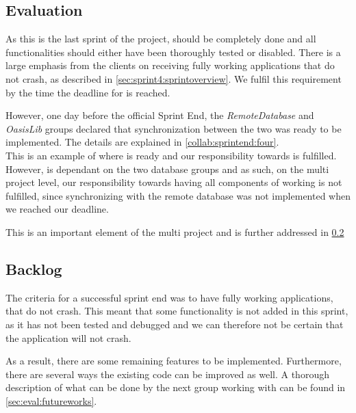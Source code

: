 \subsection{Evaluation}

As this is the last sprint of the project, \launcher should be completely done and all functionalities should either have been thoroughly tested or disabled.
There is a large emphasis from the clients on receiving  fully working applications that do not crash, as described in \cref{sec:sprint4:sprintoverview}.
We fulfil this requirement by the time the deadline for \launcher is reached.

However, one day before the official Sprint End, the \textit{RemoteDatabase} and \textit{OasisLib} groups declared that synchronization between the two was ready to be implemented.
The details are explained in \cref{collab:sprintend:four}.\\

This is an example of where \launcher is ready and our responsibility towards \launcher is fulfilled.
However, \launcher is dependant on the two database groups and as such, on the multi project level, our responsibility towards having all components of \launcher working is not fulfilled, since synchronizing with the remote database was not implemented when we reached our deadline.

This is an important element of the multi project and is further addressed in \cref{}

\subsection{Backlog}

The criteria for a successful sprint end was to have fully working applications, that do not crash.
This meant that some functionality is not added in this sprint, as it has not been tested and debugged and we can therefore not be certain that the application will not crash.

As a result, there are some remaining features to be implemented.
Furthermore, there are several ways the existing code can be improved as well.
A thorough description of what can be done by the next group working with \launcher can be found in \cref{sec:eval:futureworks}.
